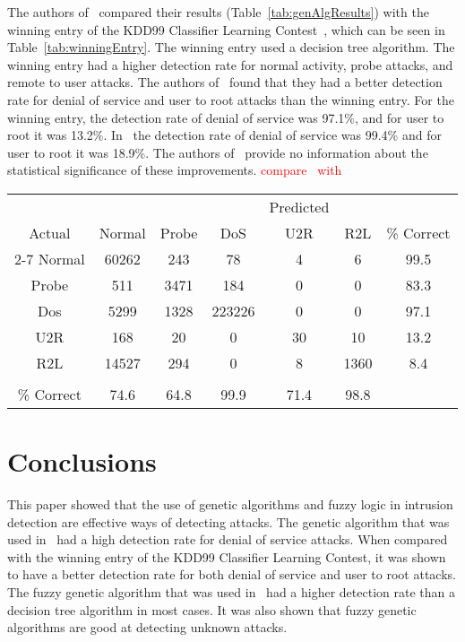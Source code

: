 \documentclass{sig-alternate}
\newcommand{\mycomment}[1]{\textcolor{red}{#1}}
\begin{document}
The authors of~\cite{DBLP:journals/corr/abs-1204-1336} compared their results (Table~\ref{tab:genAlgResults}) with the winning entry of the KDD99 Classifier Learning Contest~\cite{KDD99Contest}, which can be seen in Table~\ref{tab:winningEntry}. The winning entry used a decision tree algorithm. The winning entry had a higher detection rate for normal activity, probe attacks, and remote to user attacks. The authors of~\cite{DBLP:journals/corr/abs-1204-1336} found that they had a better detection rate for denial of service and user to root attacks than the winning entry. For the winning entry, the detection rate of denial of service was 97.1\%, and for user to root it was 13.2\%. In~\cite{DBLP:journals/corr/abs-1204-1336} the detection rate of denial of service was 99.4\% and for user to root it was 18.9\%. The authors of~\cite{DBLP:journals/corr/abs-1204-1336} provide no information about the statistical significance of these improvements.
\mycomment{compare~\cite{DBLP:journals/corr/abs-1204-1336} with~\cite{6496342, 6559603}}

\begin{table*}
\center
\caption{Results for the Winning Entry of the KDD99 Classifier Learning Contest.}
\vspace{0.20cm}
\begin{tabular}{c|cccccc}
& & & & Predicted & & \\
Actual & Normal & Probe & DoS & U2R & R2L & \% Correct \\ \cline{2-7}
Normal &  60262 & 243 & 78 & 4 & 6 & 99.5\\
Probe &  511 & 3471 & 184 & 0 & 0 & 83.3 \\
Dos &  5299 & 1328 & 223226 & 0 & 0 & 97.1\\
U2R &  168 & 20 & 0 & 30 & 10 & 13.2\\
R2L &  14527 & 294 & 0 & 8 & 1360 & 8.4\\
& &&&&& \\
\% Correct &  74.6 & 64.8 & 99.9 & 71.4 & 98.8 &\\
\end{tabular}
\center
\label{tab:winningEntry}
\end{table*}



\section{Conclusions}
\label{sec:conclusion}
This paper showed that the use of genetic algorithms and fuzzy logic in intrusion detection are effective ways of detecting attacks. The genetic algorithm that was used in~\cite{DBLP:journals/corr/abs-1204-1336} had a high detection rate for denial of service attacks. When compared with the winning entry of the KDD99 Classifier Learning Contest, it was shown to have a better detection rate for both denial of service and user to root attacks. The fuzzy genetic algorithm that was used in~\cite{6496342, 6559603} had a higher detection rate than a decision tree algorithm in most cases. It was also shown that fuzzy genetic algorithms are good at detecting unknown attacks. 
\end{document}
